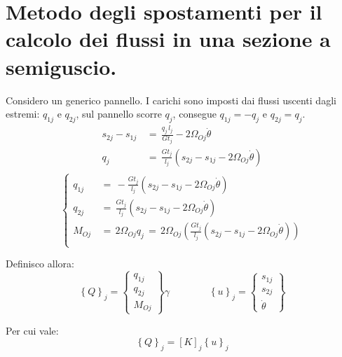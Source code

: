 \section{Metodo degli spostamenti per il calcolo dei flussi in una sezione a semiguscio.}

Considero un generico pannello. I carichi sono imposti dai flussi uscenti dagli estremi: $q_{1j}$ e $q_{2j}$, sul pannello scorre $q_j$, consegue $q_{1j} = -q_j$ e $q_{2j}=q_j$.
\begin{align*}
    s_{2j}-s_{1j} \,&=\,\frac{q_j\,l_j}{Gt_j}- 2\Omega_{Oj}\dot{\theta}\\
    q_j \,&=\,\frac{Gt_j}{l_j} (s_{2j}-s_{1j}- 2\Omega_{Oj}\dot{\theta})\\
\end{align*}
\begin{equation*}
    \begin{cases}
        q_{1j} \,&=\,-\frac{Gt_j}{l_j} (s_{2j}-s_{1j}- 2\Omega_{Oj}\dot{\theta})\\
        q_{2j} \,&=\,\frac{Gt_j}{l_j} (s_{2j}-s_{1j}- 2\Omega_{Oj}\dot{\theta})\\
        M_{Oj} \,&=\, 2\Omega_{Oj}q_j \,=\,   2\Omega_{Oj}\left(      \frac{Gt_j}{l_j} (s_{2j}-s_{1j}- 2\Omega_{Oj}\dot{\theta})\right)\\
    \end{cases}
\end{equation*}


Definisco allora:
 \begin{equation*}
     \left\{Q\right\}_j = \left\{
    \begin{array}{c}
    q_{1j} \\ q_{2j} \\ M_{Oj}
    \end{array}
    \right\} \gamma
   \quad\quad\quad\quad
    \left\{u\right\}_j = \left\{
    \begin{array}{c}
    s_{1j} \\ s_{2j} \\ \dot{\theta}
    \end{array}
    \right\} 
 \end{equation*}

Per cui vale: 
\begin{equation*}
    \left\{Q\right\}_j = [K]_j  \left\{ u\right\}_j
\end{equation*}



